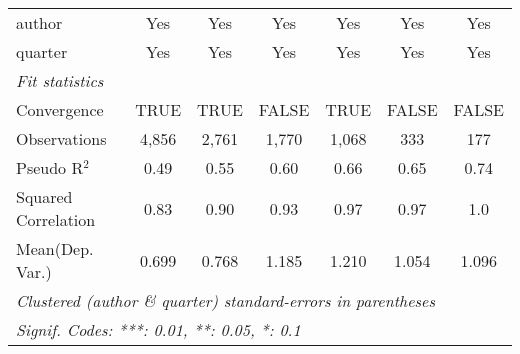 \begin{tabular}{lcccccc}
   author                                                     & Yes           & Yes           & Yes           & Yes           & Yes         & Yes\\  
   quarter                                                    & Yes           & Yes           & Yes           & Yes           & Yes         & Yes\\  
   \midrule
   \emph{Fit statistics}\\
   Convergence                                                &TRUE           & TRUE          & FALSE         & TRUE          & FALSE       & FALSE\\  
   Observations                                               & 4,856         & 2,761         & 1,770         & 1,068         & 333         & 177\\  
   Pseudo R$^2$                                               & 0.49          & 0.55          & 0.60          & 0.66          & 0.65        & 0.74\\  
   Squared Correlation                                        & 0.83          & 0.90          & 0.93          & 0.97          & 0.97        & 1.0\\  
Mean(Dep. Var.) & 0.699 & 0.768 & 1.185 & 1.210 & 1.054 & 1.096 \\
   \midrule \midrule
   \multicolumn{7}{l}{\emph{Clustered (author \& quarter) standard-errors in parentheses}}\\
   \multicolumn{7}{l}{\emph{Signif. Codes: ***: 0.01, **: 0.05, *: 0.1}}\\
\end{tabular}
\par\endgroup
